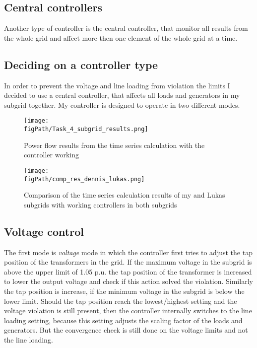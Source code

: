 \documentclass[conference]{IEEEtran}
\newcommand{\figPath}{images}
\begin{document}
\subsection{Central controllers}
Another type of controller is the central controller, that monitor all results from the whole grid and affect more then one element of the whole grid at a time.
\subsection{Deciding on a controller type}
In order to prevent the voltage and line loading from violation the limits I decided to use a central controller, that affects all loads and generators in my subgrid together. My controller is designed to operate in two different modes. 
\begin{figure*}[htbp]
	\centering
	\texttt{[image: \\figPath/Task\_4\_subgrid\_results.png]}
	\caption{Power flow results from the time series calculation with the controller working}
	\label{fig:pf_res_task_4}
\end{figure*}
\begin{figure*}[htbp]
	\centering
	\texttt{[image: \\figPath/comp\_res\_dennis\_lukas.png]}
	\caption{Comparison of the time series calculation results of my and Lukas subgrids with working controllers in both subgrids}
	\label{fig:pf_res_task_5}
\end{figure*}
\subsection*{Voltage control}
The first mode is \textit{voltage} mode in which the controller first tries to adjust the tap position of the transformers in the grid. If the maximum voltage in the subgrid is above the upper limit of 1.05 p.u. the tap position of the transformer is increased to lower the output voltage and check if this action solved the violation. Similarly the tap position is increase, if the minimum voltage in the subgrid is below the lower limit. Should the tap position reach the lowest/highest setting and the voltage violation is still present, then the controller internally switches to the line loading setting, because this setting adjusts the scaling factor of the loads and generators. But the convergence check is still done on the voltage limits and not the line loading.
\end{document}
